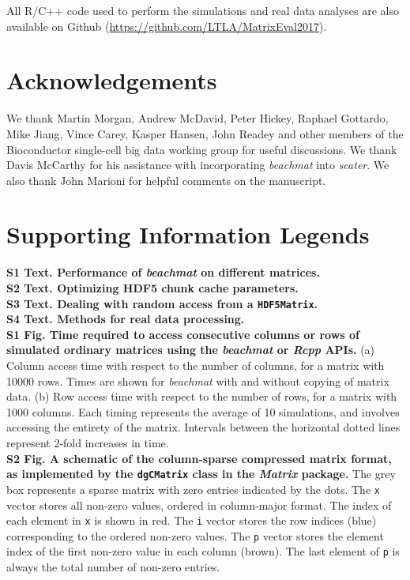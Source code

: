 \documentclass[10pt,letterpaper]{article}
\newcommand{\beachmat}{\textit{beachmat}}
\begin{document}
All R/C++ code used to perform the simulations and real data analyses are also available on Github (\url{https://github.com/LTLA/MatrixEval2017}).

\section*{Acknowledgements}
We thank Martin Morgan, Andrew McDavid, Peter Hickey, Raphael Gottardo, Mike Jiang, Vince Carey, Kasper Hansen, John Readey and other members of the Bioconductor single-cell big data working group for useful discussions.
We thank Davis McCarthy for his assistance with incorporating \beachmat{} into \textit{scater}.
We also thank John Marioni for helpful comments on the manuscript.



\section*{Supporting Information Legends}

\textbf{S1 Text. Performance of \beachmat{} on different matrices.} 
\\[0.05in]

\noindent
\textbf{S2 Text. Optimizing HDF5 chunk cache parameters.} 
\\[0.05in]

\noindent
\textbf{S3 Text. Dealing with random access from a \texttt{HDF5Matrix}.} 
\\[0.05in]

\noindent
\textbf{S4 Text. Methods for real data processing.} 
\\[0.05in]

\noindent
\textbf{S1 Fig. Time required to access consecutive columns or rows of simulated ordinary matrices using the \beachmat{} or \textit{Rcpp} APIs.}
(a) Column access time with respect to the number of columns, for a matrix with 10000 rows.
Times are shown for \beachmat{} with and without copying of matrix data.
(b) Row access time with respect to the number of rows, for a matrix with 1000 columns.
Each timing represents the average of 10 simulations, and involves accessing the entirety of the matrix.
Intervals between the horizontal dotted lines represent 2-fold increases in time.
\\[0.05in]

\noindent
\textbf{S2 Fig. A schematic of the column-sparse compressed matrix format, as implemented by the \texttt{dgCMatrix} class in the \textit{Matrix} package.}
The grey box represents a sparse matrix with zero entries indicated by the dots.
The \texttt{x} vector stores all non-zero values, ordered in column-major format.
The index of each element in \texttt{x} is shown in red.
The \texttt{i} vector stores the row indices (blue) corresponding to the ordered non-zero values.
The \texttt{p} vector stores the element index of the first non-zero value in each column (brown).
The last element of \texttt{p} is always the total number of non-zero entries.
\\[0.05in]
\end{document}
